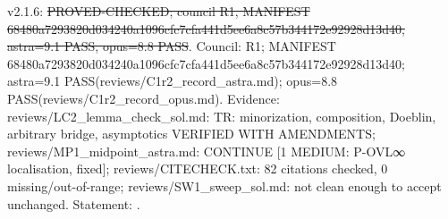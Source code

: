 \begin{theorem}\label{reg:W3-SAMP_TR}
\end{theorem}
\begin{statusbox}
 v2.1.6: \st{PROVED-CHECKED; council R1, MANIFEST 68480a7293820d034240a1096cfc7cfa441d5ee6a8c57b344172e92928d13d40, astra=9.1 PASS, opus=8.8 PASS}. Council: R1; MANIFEST 68480a7293820d034240a1096cfc7cfa441d5ee6a8c57b344172e92928d13d40; astra=9.1 PASS(reviews/C1r2\_record\_astra.md); opus=8.8 PASS(reviews/C1r2\_record\_opus.md). Evidence: reviews/LC2\_lemma\_check\_sol.md: TR: minorization, composition, Doeblin, arbitrary bridge, asymptotics VERIFIED WITH AMENDMENTS; reviews/MP1\_midpoint\_astra.md: CONTINUE [1 MEDIUM: P-OVL∞ localisation, fixed]; reviews/CITECHECK.txt: 82 citations checked, 0 missing/out-of-range; reviews/SW1\_sweep\_sol.md: not clean enough to accept unchanged. Statement: .
\end{statusbox}
